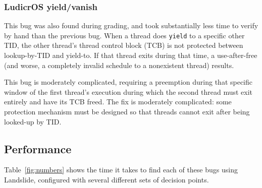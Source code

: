 \subsubsection{LudicrOS yield/vanish}

This bug was also found during grading, and took substantially less time to verify by hand than the previous bug. When a thread does \texttt{yield} to a specific other TID, the other thread's thread control block (TCB) is not protected between lookup-by-TID and yield-to. If that thread exits during that time, a use-after-free (and worse, a completely invalid schedule to a nonexistent thread) results.

This bug is moderately complicated, requiring a preemption during that specific window of the first thread's execution during which the second thread must exit entirely and have its TCB freed. The fix is moderately complicated: some protection mechanism must be designed so that threads cannot exit after being looked-up by TID.

\subsection{Performance}
\label{sec:eval-numbers}

Table~\ref{fig:numbers} shows the time it takes to find each of these bugs using Landslide, configured with several different sets of decision points.

\newcommand\bugnum[2]{\textcolor{BrickRed}{{\bf #1} {\scriptsize \em (#2)}}}
\newcommand\nobugnum[2]{\textcolor{Blue}{[{\em #1 {\scriptsize (#2)}}]}}


